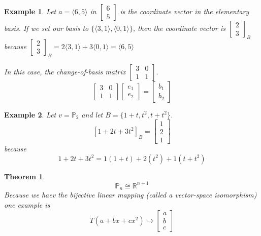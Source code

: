 \documentclass[11pt]{article}
\newtheorem{thm}{Theorem}
\newtheorem{ex}{Example}
\begin{document}
\begin{ex}
  Let $a = \langle 6,5 \rangle$ in  $\begin{bmatrix} 6 \\ 5 \end{bmatrix}$ is the coordinate vector in the elementary basis. If we set our basis
  to $\{\langle 3,1 \rangle, \langle 0, 1\rangle\}$, then the coordinate vector is $\begin{bmatrix} 2 \\ 3 \end{bmatrix}_{B}$ because
  $\begin{bmatrix} 2 \\ 3 \end{bmatrix}_{B} = 2\langle 3,1 \rangle + 3 \langle 0,1\rangle = \langle 6,5\rangle$

  In this case, the change-of-basis matrix $\begin{bmatrix} 3 & 0 \\ 1 & 1 \end{bmatrix}$.
  \[\begin{bmatrix} 3 & 0 \\ 1 & 1\end{bmatrix}\begin{bmatrix} e_{1} \\ e_{2} \end{bmatrix} =\begin{bmatrix} b_{1}\\b_{2}\end{bmatrix}\]
\end{ex}

\begin{ex}
  Let $v = \mathbb{P}_{2}$ and let $B = \{1+t, t^{2}, t+t^{2}\}$.
  \[[1+2t+3t^{2}]_{B} = \begin{bmatrix} 1 \\2 \\ 1\end{bmatrix}\]
  because
  \[1+2t+3t^{2} = 1(1+t) + 2(t^{2})+1(t+t^{2})\]
\end{ex}
\begin{thm}
  \[\mathbb{P}_{n} \cong \mathbb{R}^{n+1}\]
  Because we haev the bijective linear mapping (called a vector-space isomorphism)
  one example is
  \[T(a +bx + cx^{2}) \mapsto \begin{bmatrix} a \\ b \\ c \end{bmatrix}\]
\end{thm}
\end{document}
